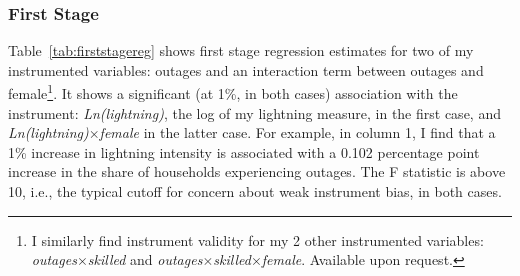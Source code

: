 \documentclass[12pt]{article}
\begin{document}
\subsubsection{First Stage}
\noindent Table~\ref{tab:firststagereg} shows first stage regression estimates for two of my instrumented variables: outages and an interaction term between outages and female\footnote{I similarly find instrument validity for my 2 other instrumented variables: \textit{outages}$\times$\textit{skilled} and \textit{outages}$\times$\textit{skilled}$\times$\textit{female}. Available upon request.}. It shows a significant (at 1\%, in both cases) association with the instrument: \textit{Ln(lightning)}, the log of my lightning measure, in the first case, and \textit{Ln(lightning)}$\times$\textit{female} in the latter case. For example, in column 1, I find that a 1\% increase in lightning intensity is associated with a 0.102 percentage point increase in the share of households experiencing outages. The F statistic is above 10, i.e., the typical cutoff for concern about weak instrument bias,  in both cases.
\end{document}
